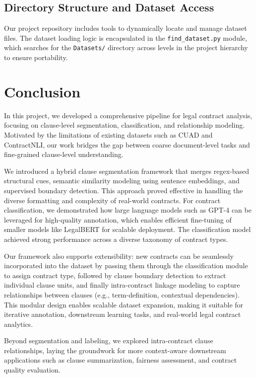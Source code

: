 \documentclass[11pt, oneside]{article}   	%
\begin{document}
\subsection*{Directory Structure and Dataset Access}

Our project repository includes tools to dynamically locate and manage dataset files. The dataset loading logic is encapsulated in the \texttt{find\_dataset.py} module, which searches for the \texttt{Datasets/} directory across levels in the project hierarchy to ensure portability.


\section*{Conclusion}

In this project, we developed a comprehensive pipeline for legal contract analysis, focusing on clause-level segmentation, classification, and relationship modeling. Motivated by the limitations of existing datasets such as CUAD and ContractNLI, our work bridges the gap between coarse document-level tasks and fine-grained clause-level understanding.

We introduced a hybrid clause segmentation framework that merges regex-based structural cues, semantic similarity modeling using sentence embeddings, and supervised boundary detection. This approach proved effective in handling the diverse formatting and complexity of real-world contracts. For contract classification, we demonstrated how large language models such as GPT-4 can be leveraged for high-quality annotation, which enables efficient fine-tuning of smaller models like LegalBERT for scalable deployment. The classification model achieved strong performance across a diverse taxonomy of contract types.

Our framework also supports extensibility: new contracts can be seamlessly incorporated into the dataset by passing them through the classification module to assign contract type, followed by clause boundary detection to extract individual clause units, and finally intra-contract linkage modeling to capture relationships between clauses (e.g., term-definition, contextual dependencies). This modular design enables scalable dataset expansion, making it suitable for iterative annotation, downstream learning tasks, and real-world legal contract analytics.

Beyond segmentation and labeling, we explored intra-contract clause relationships, laying the groundwork for more context-aware downstream applications such as clause summarization, fairness assessment, and contract quality evaluation.
\end{document}
